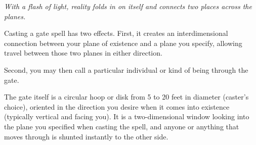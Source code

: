 \emph{With a flash of light, reality folds in on itself and connects two places across the planes.}

Casting a gate spell has two effects. 
First, it creates an interdimensional connection between your plane of existence and a plane you specify, allowing travel between those two planes in either direction.

Second, you may then call a particular individual or kind of being through the gate.

The gate itself is a circular hoop or disk from 5 to 20 feet in diameter (caster's choice), 
oriented in the direction you desire when it comes into existence (typically vertical and facing you). It is a two-dimensional window looking into the plane you specified when casting the spell, and anyone or anything that moves through is shunted instantly to the other side.

